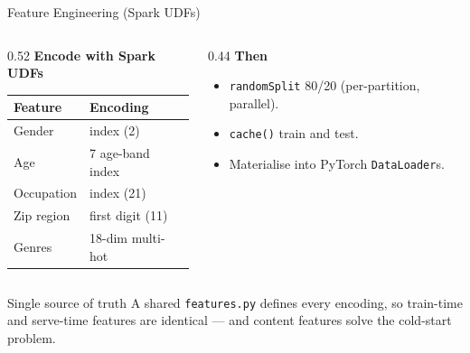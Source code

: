 \documentclass[aspectratio=169]{beamer}
\begin{document}
\begin{frame}{Feature Engineering (Spark UDFs)}
\begin{columns}[T]
  \begin{column}{0.52\textwidth}
    \textbf{Encode with Spark UDFs}
    \begin{table}\footnotesize
    \centering
    \begin{tabular}{ll}
    \toprule
    \textbf{Feature} & \textbf{Encoding} \\
    \midrule
    Gender     & index (2) \\
    Age        & 7 age-band index \\
    Occupation & index (21) \\
    Zip region & first digit (11) \\
    Genres     & 18-dim multi-hot \\
    \bottomrule
    \end{tabular}
    \end{table}
  \end{column}
  \begin{column}{0.44\textwidth}
    \textbf{Then}
    \begin{itemize}
      \item \texttt{randomSplit} 80/20 (per-partition, parallel).
      \item \texttt{cache()} train and test.
      \item Materialise into PyTorch \texttt{DataLoader}s.
    \end{itemize}
  \end{column}
\end{columns}

\vspace{0.15cm}
\begin{block}{Single source of truth}
A shared \texttt{features.py} defines every encoding, so train-time and serve-time features are identical --- and content features solve the cold-start problem.
\end{block}
\end{frame}
\end{document}
